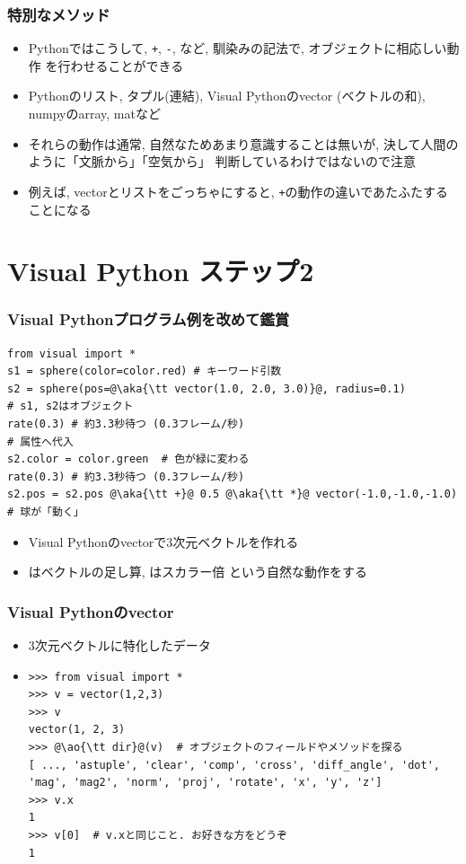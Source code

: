 \documentclass[10pt,dvipdfmx]{beamer}
\newcommand{\ao}[1]{{\color{blue}#1}}
\newcommand{\aka}[1]{{\color{red}#1}}
\begin{document}
\begin{frame}[fragile]
\frametitle{特別なメソッド}

\begin{itemize}
\item Pythonではこうして, {\tt +}, {\tt -}, {\tt *}など,
  \ao{馴染みの記法で, オブジェクトに相応しい動作}
  を行わせることができる
\item Pythonのリスト, タプル(\ao{連結}), 
  Visual Pythonのvector (\ao{ベクトルの和}), numpyのarray, matなど
\item それらの動作は通常, 自然なためあまり意識することは無いが,
  決して人間のように「文脈から」「空気から」
  判断しているわけではないので注意
\item 例えば, vectorとリストをごっちゃにすると, 
  {\tt +}の動作の違いであたふたすることになる
\end{itemize}
\end{frame}

\section{Visual Python ステップ2}


\begin{frame}[fragile]
\frametitle{Visual Pythonプログラム例を改めて鑑賞}
\begin{lstlisting}
from visual import *
s1 = sphere(color=color.red) # キーワード引数
s2 = sphere(pos=@\aka{\tt vector(1.0, 2.0, 3.0)}@, radius=0.1)
# s1, s2はオブジェクト
rate(0.3) # 約3.3秒待つ (0.3フレーム/秒)
# 属性へ代入
s2.color = color.green  # 色が緑に変わる
rate(0.3) # 約3.3秒待つ (0.3フレーム/秒)
s2.pos = s2.pos @\aka{\tt +}@ 0.5 @\aka{\tt *}@ vector(-1.0,-1.0,-1.0) # 球が「動く」
\end{lstlisting}

\begin{itemize}
\item Visual Pythonの\ao{vectorで3次元ベクトル}を作れる
\item \ao{{\tt +} はベクトルの足し算, {\tt *}はスカラー倍}
  という自然な動作をする
\end{itemize}
\end{frame}

\fi

\begin{frame}[fragile]
\frametitle{Visual Pythonのvector}
\begin{itemize}
\item [] 3次元ベクトルに特化したデータ
\item []
\begin{lstlisting}
>>> from visual import *
>>> v = vector(1,2,3)
>>> v
vector(1, 2, 3)
>>> @\ao{\tt dir}@(v)  # オブジェクトのフィールドやメソッドを探る
[ ..., 'astuple', 'clear', 'comp', 'cross', 'diff_angle', 'dot', 'mag', 'mag2', 'norm', 'proj', 'rotate', 'x', 'y', 'z']
>>> v.x
1
>>> v[0]  # v.xと同じこと. お好きな方をどうぞ
1
\end{lstlisting}
\end{itemize}
\end{frame}
\end{document}
